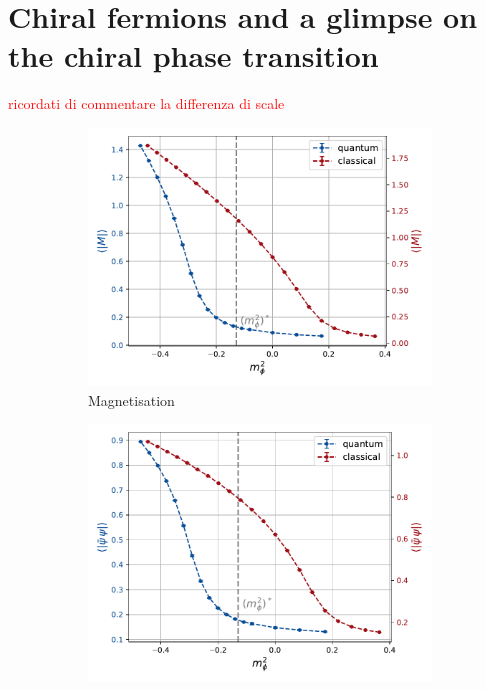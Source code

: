 \newpage



\newpage
\section{Chiral fermions and a glimpse on the chiral phase transition}
\label{sec:chiral_PT}
\textcolor{red}{ricordati di commentare la differenza di scale}
\begin{figure}
    \centering
    \begin{subfigure}[b]{0.45\textwidth}
        \includegraphics[scale=0.5]{figures/chiral_PT/mass_scan/magnetisation.pdf}
        \caption{Magnetisation}
    \end{subfigure}
    \hfill
    \begin{subfigure}[b]{0.45\textwidth}
        \includegraphics[scale=0.5]{figures/chiral_PT/mass_scan/condensate.pdf}

\end{subfigure}
\end{figure}
